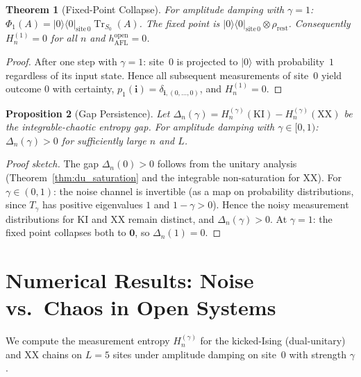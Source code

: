 \documentclass[12pt,a4paper]{article}
\newtheorem{theorem}{Theorem}[section]
\newtheorem{proposition}[theorem]{Proposition}
\begin{document}
\begin{theorem}[Fixed-Point Collapse]
\label{thm:fixed_point_collapse}
For amplitude damping with $\gamma=1$: $\Phi_1(A)=|0\rangle\langle 0|_{\mathrm{site\,0}}\operatorname{Tr}_{S_0}(A)$.
The fixed point is $|0\rangle\langle 0|_{\mathrm{site\,0}}\otimes\rho_{\mathrm{rest}}$.
Consequently $H_n^{(1)}=0$ for all $n$ and $h_{\mathrm{AFL}}^{\mathrm{open}}=0$.
\end{theorem}
\begin{proof}
After one step with $\gamma=1$: site~$0$ is projected to $|0\rangle$
with probability~$1$ regardless of its input state.  Hence all subsequent
measurements of site~$0$ yield outcome $0$ with certainty,
$p_1(\mathbf{i})=\delta_{\mathbf{i},(0,\ldots,0)}$, and $H_n^{(1)}=0$.
\end{proof}

\begin{proposition}[Gap Persistence]
\label{prop:gap_persist}
Let $\Delta_n(\gamma) = H_n^{(\gamma)}(\mathrm{KI}) - H_n^{(\gamma)}(\mathrm{XX})$
be the integrable-chaotic entropy gap.  For amplitude damping with
$\gamma\in[0,1)$: $\Delta_n(\gamma)>0$ for sufficiently large $n$ and $L$.
\end{proposition}
\begin{proof}[Proof sketch]
The gap $\Delta_n(0)>0$ follows from the unitary analysis
(Theorem~\ref{thm:du_saturation} and the integrable non-saturation for XX).
For $\gamma\in(0,1)$: the noise channel is invertible (as a map on
probability distributions, since $T_{\gamma}$ has positive eigenvalues $1$
and $1-\gamma>0$).  Hence the noisy measurement distributions for KI and XX
remain distinct, and $\Delta_n(\gamma)>0$.  At $\gamma=1$: the fixed point
collapses both to $\mathbf{0}$, so $\Delta_n(1)=0$.
\end{proof}

\section{Numerical Results: Noise vs.\ Chaos in Open Systems}
\label{sec:noise_numerics}

We compute the measurement entropy $H_n^{(\gamma)}$ for the kicked-Ising
(dual-unitary) and XX chains on $L=5$ sites under amplitude damping on site~$0$
with strength $\gamma$.
\end{document}
